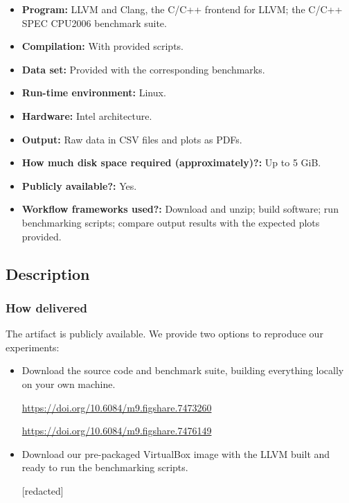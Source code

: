 {\small
\begin{itemize}
  \item {\bf Program: } LLVM and Clang, the C/C++ frontend for LLVM; the C/C++ SPEC CPU2006 benchmark suite.
  \item {\bf Compilation: } With provided scripts.
  \item {\bf Data set: } Provided with the corresponding benchmarks.
  \item {\bf Run-time environment: } Linux.
  \item {\bf Hardware: } Intel architecture.
  \item {\bf Output: } Raw data in CSV files and plots as PDFs.
  \item {\bf How much disk space required (approximately)?: } Up to 5 GiB.
  \item {\bf Publicly available?: } Yes.
  \item {\bf Workflow frameworks used?: } Download and unzip; build software; run benchmarking scripts; compare output results with the expected plots provided.
\end{itemize}

\subsection{Description}

\subsubsection{How delivered}

The artifact is publicly available.
We provide two options to reproduce our experiments:

\begin{itemize}
  \item Download the source code and benchmark suite, building everything locally on your own machine.

\url{https://doi.org/10.6084/m9.figshare.7473260}

\url{https://doi.org/10.6084/m9.figshare.7476149}

  \item Download our pre-packaged VirtualBox image with the LLVM built and ready
to run the benchmarking scripts.

[redacted]


\end{itemize}}
